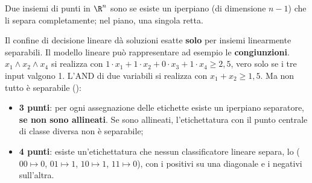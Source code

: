 \begin{definizione}
Due insiemi di punti in $\R^n$ sono  se esiste un iperpiano (di dimensione
$n-1$) che li separa completamente; nel piano, una singola retta.
\end{definizione}

Il confine di decisione lineare dà soluzioni esatte \textbf{solo} per insiemi linearmente separabili. Il modello
lineare può rappresentare ad esempio le \textbf{congiunzioni}. $x_1\wedge x_2\wedge x_4$ si realizza con
$1\cdot x_1+1\cdot x_2+0\cdot x_3+1\cdot x_4\ge 2{,}5$, vero solo se i tre input valgono 1. L'AND di due
variabili si realizza con $x_1+x_2\ge1{,}5$. Ma non tutto è separabile ():
\begin{itemize}
  \item \textbf{3 punti}: per ogni assegnazione delle etichette esiste un iperpiano separatore, \textbf{se non
        sono allineati}. Se sono allineati, l'etichettatura con il punto centrale di classe diversa non è
        separabile;
  \item \textbf{4 punti}: esiste un'etichettatura che nessun classificatore lineare separa, lo 
        ($00\mapsto0$, $01\mapsto1$, $10\mapsto1$, $11\mapsto0$), con i positivi su una diagonale e i negativi
        sull'altra.
\end{itemize}

